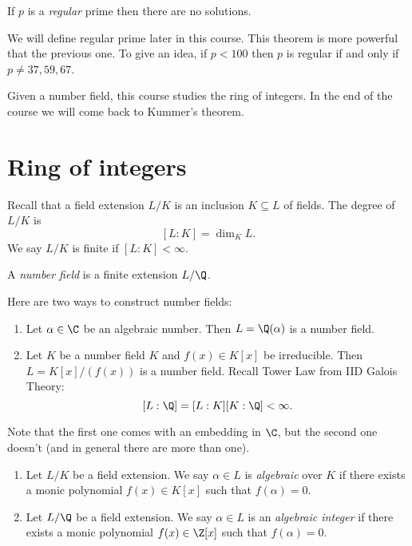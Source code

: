 \documentclass[a4paper]{article}
\begin{document}
\begin{theorem}[Kummer, 1850]
  If \(p\) is a \emph{regular} prime then there are no solutions.
\end{theorem}

We will define regular prime later in this course. This theorem is more powerful that the previous one. To give an idea, if \(p < 100\) then \(p\) is regular if and only if \(p \neq 37, 59, 67\).

Given a number field, this course studies the ring of integers. In the end of the course we will come back to Kummer's theorem.

\section{Ring of integers}

Recall that a field extension \(L/K\) is an inclusion \(K \subseteq L\) of fields. The degree of \(L/K\) is
\[
  [L:K] = \dim_K L.
\]
We say \(L/K\) is finite if \([L:K] < \infty\).

\begin{definition}
  A \emph{number field} is a finite extension \(L/\Q\).
\end{definition}

Here are two ways to construct number fields:
\begin{enumerate}
\item Let \(\alpha \in \C\) be an algebraic number. Then \(L = \Q(\alpha)\) is a number field.
\item Let \(K\) be a number field \(K\) and \(f(x) \in K[x]\) be irreducible. Then \(L = K[x]/(f(x))\) is a number field. Recall Tower Law from IID Galois Theory:
  \[
    [L:\Q] = [L:K][K:\Q] < \infty.
  \]
\end{enumerate}
Note that the first one comes with an embedding in \(\C\), but the second one doesn't (and in general there are more than one).

\begin{definition}\leavevmode
  \begin{enumerate}
  \item Let \(L/K\) be a field extension. We say \(\alpha \in L\) is \emph{algebraic} over \(K\) if there exists a monic polynomial \(f(x) \in K[x]\) such that \(f(\alpha) = 0\).
  \item Let \(L/\Q\) be a field extension. We say \(\alpha \in L\) is an \emph{algebraic integer} if there exists a monic polynomial \(f(x) \in \Z[x]\) such that \(f(\alpha) = 0\).
  \end{enumerate}
\end{definition}
\end{document}
